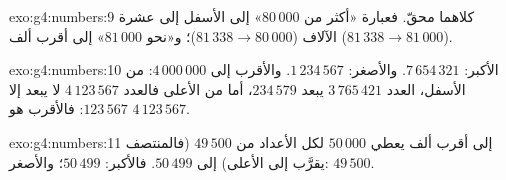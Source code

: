 \begin{solution}{exo:g4:numbers:9}
كلاهما محقّ. فعبارة «أكثر من $80\,000$»  إلى الأسفل إلى
عشرة الآلاف ($81\,338 \to 80\,000$)؛ و«نحو $81\,000$»  إلى
أقرب ألف ($81\,338 \to 81\,000$).
\end{solution}

\begin{solution}{exo:g4:numbers:10}
الأكبر: $7\,654\,321$. والأصغر: $1\,234\,567$. والأقرب إلى
$4\,000\,000$: من الأسفل، العدد $3\,765\,421$ يبعد
$234\,579$، أما من الأعلى فالعدد $4\,123\,567$ لا يبعد إلا
$123\,567$: فالأقرب هو $4\,123\,567$.
\end{solution}

\begin{solution}{exo:g4:numbers:11}
 إلى أقرب ألف يعطي $50\,000$ لكل الأعداد
من $49\,500$ (فالمنتصف يقرَّب إلى الأعلى) إلى $50\,499$. فالأكبر:
$50\,499$؛ والأصغر: $49\,500$.
\end{solution}
